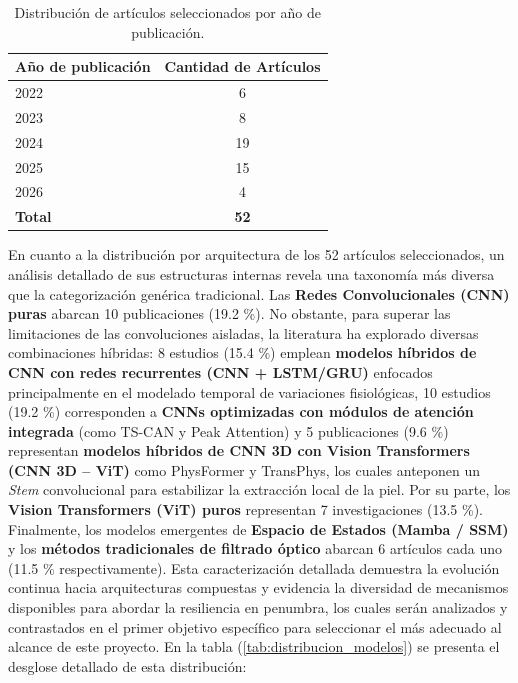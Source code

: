 \begin{table}[htbp]
    \centering
    \caption{Distribución de artículos seleccionados por año de publicación.}
    \label{tab:distribucion_anio}
    \begin{tabular}{|l|c|}
        \hline
        \textbf{Año de publicación} & \textbf{Cantidad de Artículos} \\ \hline
        2022                        & 6                              \\ \hline
        2023                        & 8                              \\ \hline
        2024                        & 19                             \\ \hline
        2025                        & 15                             \\ \hline
        2026                        & 4                              \\ \hline
        \textbf{Total}              & \textbf{52}                    \\ \hline
    \end{tabular}
\end{table}

\newpage
En cuanto a la distribución por arquitectura de los 52 artículos seleccionados, un análisis detallado de sus estructuras internas revela una taxonomía más 
diversa que la categorización genérica tradicional. Las \textbf{Redes Convolucionales (CNN) puras} abarcan 10 publicaciones (19.2 \%). No obstante, para 
superar las limitaciones de las convoluciones aisladas, la literatura ha explorado diversas combinaciones híbridas: 8 estudios (15.4 \%) emplean 
\textbf{modelos híbridos de CNN con redes recurrentes (CNN + LSTM/GRU)} enfocados principalmente en el modelado temporal de variaciones fisiológicas, 10 
estudios (19.2 \%) corresponden a \textbf{CNNs optimizadas con módulos de atención integrada} (como TS-CAN y Peak Attention) y 5 publicaciones (9.6 \%) 
representan \textbf{modelos híbridos de CNN 3D con Vision Transformers (CNN 3D -- ViT)} como PhysFormer y TransPhys, los cuales anteponen un 
\textit{Stem} convolucional para estabilizar la extracción local de la piel. Por su parte, los \textbf{Vision Transformers (ViT) puros} representan 7 
investigaciones (13.5 \%). Finalmente, los modelos emergentes de \textbf{Espacio de Estados (Mamba / SSM)} y los 
\textbf{métodos tradicionales de filtrado óptico} abarcan 6 artículos cada uno (11.5 \% respectivamente). Esta caracterización detallada demuestra la evolución continua hacia arquitecturas 
compuestas y evidencia la diversidad de mecanismos disponibles para abordar la 
resiliencia en penumbra, los cuales serán analizados y contrastados en el primer 
objetivo específico para seleccionar el más adecuado al alcance de este proyecto. 
En la tabla (\ref{tab:distribucion_modelos}) se presenta el desglose detallado de esta distribución:

